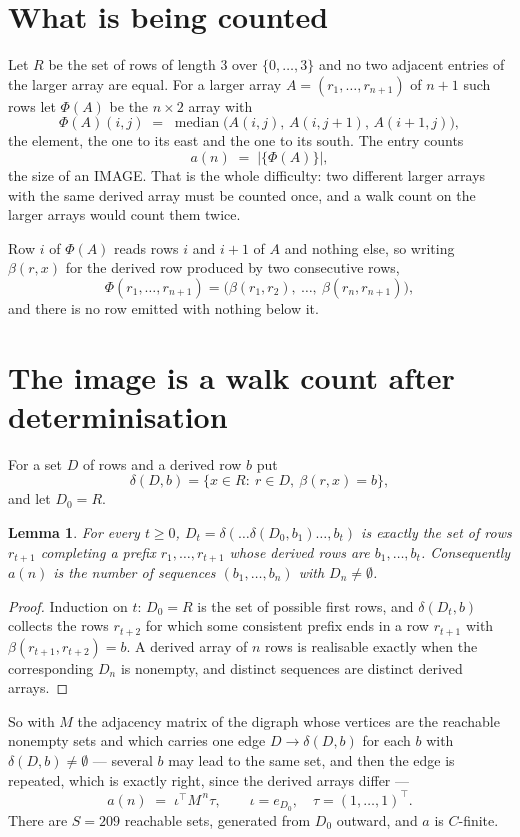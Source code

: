 \documentclass[11pt,a4paper]{article}
\theoremstyle{plain}
\newtheorem{lemma}[theorem]{Lemma}
\theoremstyle{definition}
\begin{document}
\section{What is being counted}

Let $R$ be the set of rows of length $3$ over $\{0,\dots,3\}$ and no two adjacent entries of the larger array are equal.
For a larger array $A=(r_1,\dots,r_{n+1})$ of $n+1$ such rows let $\Phi(A)$ be the
$n\times2$ array with
\[
\Phi(A)(i,j)\;=\;\operatorname{median}\bigl(A(i,j),\,A(i,j+1),\,A(i+1,j)\bigr),
\]
the element, the one to its east and the one to its south. The entry counts
\[
a(n)\;=\;\bigl|\{\Phi(A)\}\bigr| ,
\]
the size of an IMAGE. That is the whole difficulty: two different larger arrays with the same
derived array must be counted once, and a walk count on the larger arrays would count them
twice.

Row $i$ of $\Phi(A)$ reads rows $i$ and $i+1$ of $A$ and nothing else, so
writing $\beta(r,x)$ for the derived row produced by two consecutive rows,
\[
\Phi(r_1,\dots,r_{n+1})=\bigl(\beta(r_1,r_2),\ \dots,\ \beta(r_n,r_{n+1})\bigr),
\]
and there is no row emitted with nothing below it.

\section{The image is a walk count after determinisation}

For a set $D$ of rows and a derived row $b$ put
\[
\delta(D,b)=\{x\in R:\ r\in D,\ \beta(r,x)=b\},
\]
and let $D_0=R$.

\begin{lemma}\label{lem:det}
For every $t\ge0$, $D_t=\delta(\dots\delta(D_0,b_1)\dots,b_t)$ is exactly the set of rows
$r_{t+1}$ completing a prefix $r_1,\dots,r_{t+1}$ whose derived rows are $b_1,\dots,b_t$.
Consequently $a(n)$ is the number of sequences $(b_1,\dots,b_n)$ with $D_n\neq\emptyset$.
\end{lemma}

\begin{proof}
Induction on $t$: $D_0=R$ is the set of possible first rows, and $\delta(D_t,b)$ collects the
rows $r_{t+2}$ for which some consistent prefix ends in a row $r_{t+1}$ with
$\beta(r_{t+1},r_{t+2})=b$. A derived array of $n$ rows is realisable exactly when the
corresponding $D_n$ is nonempty, and distinct sequences are distinct derived arrays.
\end{proof}

So with $M$ the adjacency matrix of the digraph whose vertices are the reachable nonempty sets
and which carries one edge $D\to\delta(D,b)$ for each $b$ with $\delta(D,b)\neq\emptyset$ ---
several $b$ may lead to the same set, and then the edge is repeated, which is exactly right,
since the derived arrays differ ---
\[
a(n)\;=\;\iota^{\!\top}M^{\,n}\tau,\qquad \iota=e_{D_0},\quad \tau=(1,\dots,1)^{\!\top} .
\]
There are $S=209$ reachable sets, generated from $D_0$ outward, and $a$ is $C$-finite.
\end{document}

